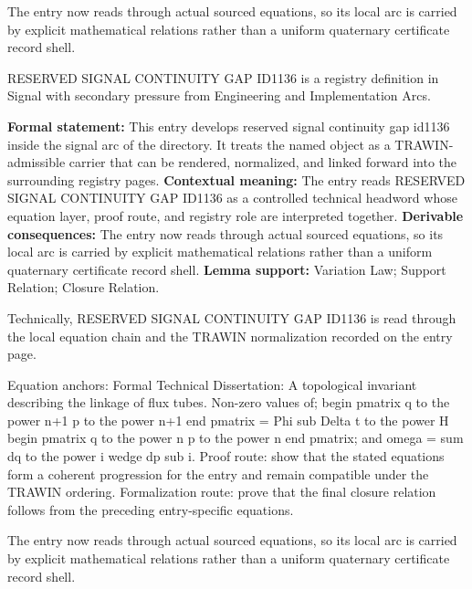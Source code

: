 The entry now reads through actual sourced equations, so its local arc is carried by explicit mathematical relations rather than a uniform quaternary certificate record shell.
\clearpage


\begingroup\small
{}
RESERVED SIGNAL CONTINUITY GAP ID1136 is a registry definition in Signal with secondary pressure from Engineering and Implementation Arcs.

\begingroup\footnotesize\setlength{\emergencystretch}{3em}\sloppy
\textbf{Formal statement:} This entry develops reserved signal continuity gap id1136 inside the signal arc of the directory. It treats the named object as a TRAWIN-admissible carrier that can be rendered, normalized, and linked forward into the surrounding registry pages. \textbf{Contextual meaning:} The entry reads RESERVED SIGNAL CONTINUITY GAP ID1136 as a controlled technical headword whose equation layer, proof route, and registry role are interpreted together. \textbf{Derivable consequences:} The entry now reads through actual sourced equations, so its local arc is carried by explicit mathematical relations rather than a uniform quaternary certificate record shell. \textbf{Lemma support:} Variation Law; Support Relation; Closure Relation.\par
\endgroup

Technically, RESERVED SIGNAL CONTINUITY GAP ID1136 is read through the local equation chain and the TRAWIN normalization recorded on the entry page.

Equation anchors: Formal Technical Dissertation: A topological invariant describing the linkage of flux tubes. Non-zero values of; begin pmatrix q to the power n+1 p to the power n+1 end pmatrix = Phi sub Delta t to the power H begin pmatrix q to the power n p to the power n end pmatrix; and omega = sum dq to the power i wedge dp sub i. Proof route: show that the stated equations form a coherent progression for the entry and remain compatible under the TRAWIN ordering. Formalization route: prove that the final closure relation follows from the preceding entry-specific equations.

The entry now reads through actual sourced equations, so its local arc is carried by explicit mathematical relations rather than a uniform quaternary certificate record shell.
\endgroup

